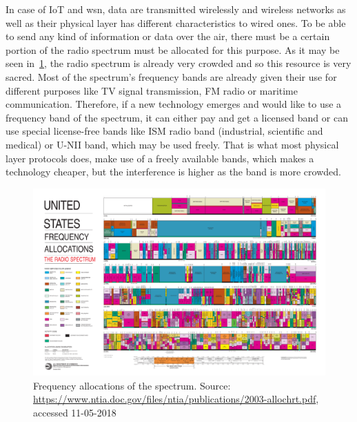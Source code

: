 In case of IoT and \acrfull{wsn}, data are transmitted wirelessly and wireless networks as well as their physical layer has different characteristics to wired ones. To be able to send any kind of information or data over the air, there must be a certain portion of the radio spectrum must be allocated for this purpose. As it may be seen in~\ref{fig:freq-alloc}, the radio spectrum is already very crowded and so this resource is very sacred. Most of the spectrum’s frequency bands are already given their use for different purposes like TV signal transmission, FM radio or maritime communication. Therefore, if a new technology emerges and would like to use a frequency band of the spectrum, it can either pay and get a licensed band or can use special license-free bands like ISM radio band (industrial, scientific and medical) or U-NII band, which may be used freely. That is what most physical layer protocols does, make use of a freely available bands, which makes a technology cheaper, but the interference is higher as the band is more crowded.

\begin{figure}[ht]
    \centering
    
    \includegraphics[width=\textwidth]{00images/freq-alloc}
    \caption{Frequency allocations of the spectrum. Source: \url{https://www.ntia.doc.gov/files/ntia/publications/2003-allochrt.pdf}, accessed 11-05-2018}
    \label{fig:freq-alloc}
\end{figure}

